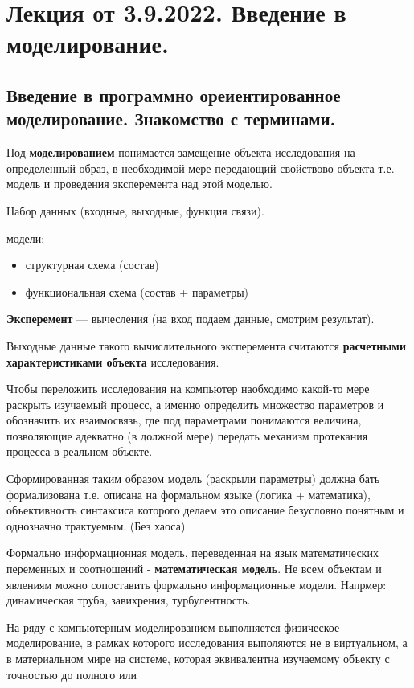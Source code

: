 \section{Лекция от 3.9.2022. Введение в моделирование.}
\subsection{Введение в программно ореиентированное моделирование. Знакомство с
терминами.}
Под \textbf{моделированием} понимается замещение объекта исследования на 
определенный образ, в необходимой мере передающий свойствово объекта т.е. модель 
и проведения эксперемента над этой моделью.\par
Набор данных (входные, выходные, функция связи).\\
{ модели:
  \begin{itemize}
    \item структурная схема (состав)
    \item функциональная схема (состав + параметры)
  \end{itemize}}
\textbf{Эксперемент} --- вычесления (на вход подаем данные, смотрим
результат).\par
Выходные данные такого вычислительного эксперемента считаются \textbf{расчетными
характеристиками объекта} исследования.\par
Чтобы переложить исследования на компьютер наобходимо какой-то мере раскрыть
изучаемый процесс, а именно определить множество параметров и обозначить их
взаимосвязь, где под параметрами понимаются величина, позволяющие адекватно (в
должной мере) передать механизм протекания процесса в реальном объекте.\par
Сформированная таким образом модель (раскрыли параметры) должна бать
формализована т.е. описана на формальном языке (логика + математика),
объективность синтаксиса которого делаем это описание безусловно понятным и
однозначно трактуемым. (Без хаоса)\par
Формально информационная модель, переведенная на язык математических переменных
и соотношений - \textbf{математическая модель}.
Не всем объектам и явлениям можно сопоставить формально информационные модели.
Напрмер: динамическая труба, завихрения, турбулентность.\par
На ряду с компьютерным моделированием выполняется физическое моделирование, в
рамках которого исследования выполяются не в виртуальном, а в материальном мире
на системе, которая эквивалентна изучаемому объекту с точностью до полного или
